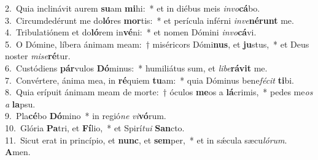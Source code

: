 {2.~}Quia inclinávit aurem \textbf{su}am \textbf{mi}hi:~* et in diébus meis \textit{in}\textit{vo}\textbf{cá}bo.\\
{3.~}Circumdedérunt me do\textbf{ló}res \textbf{mor}tis:~* et perícula inférni \textit{in}\textit{ve}\textbf{né}\textbf{runt} me.\\
{4.~}Tribulatiónem et do\textbf{ló}rem in\textbf{vé}ni:~* et nomen Dómini \textit{in}\textit{vo}\textbf{cá}vi.\\
{5.~}O Dómine, líbera ánimam meam:~† miséricors Dómi\textbf{nus}, et \textbf{ju}stus,~* et Deus noster \textit{mi}\textit{se}\textbf{ré}tur.\\
{6.~}Custódiens \textbf{pár}vulos \textbf{Dó}minus:~* humiliátus sum, et \textit{li}\textit{be}\textbf{rá}\textbf{vit} me.\\
{7.~}Convértere, ánima mea, in \textbf{ré}quiem \textbf{tu}am:~* quia Dóminus bene\textit{fé}\textit{cit} \textbf{ti}bi.\\
{8.~}Quia erípuit ánimam meam de morte:~† óculos \textbf{me}os a \textbf{lá}crimis,~* pedes me\textit{os} \textit{a} \textbf{la}psu.\\
{9.~}Pla\textbf{cé}bo \textbf{Dó}mino~* in regió\textit{ne} \textit{vi}\textbf{vó}rum.\\
{10.~}Glória \textbf{Pa}tri, et \textbf{Fí}lio,~* et Spirí\textit{tu}\textit{i} \textbf{San}cto.\\
{11.~}Sicut erat in princípio, et \textbf{nunc}, et \textbf{sem}per,~* et in sǽcula sæcu\textit{ló}\textit{rum}. \textbf{A}men.\\
